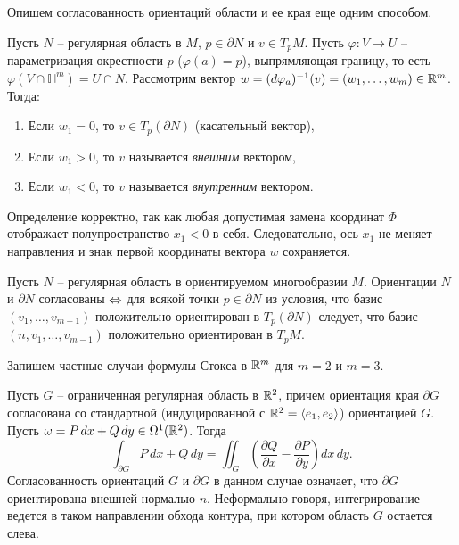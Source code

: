 Опишем согласованность ориентаций области и ее края еще одним способом.

\begin{definition}
    Пусть $N$ -- регулярная область в $M$, $p \in \partial N$ и $v \in T_p M$. 
    Пусть $\varphi: V \to U$ -- параметризация окрестности $p$ ($\varphi(a)=p$), выпрямляющая границу, то есть $\varphi(V \cap \mathbb{H}^m) = U \cap N$. 
    Рассмотрим вектор $w = (d\varphi_a)^{-1}(v) = (w_1, \dots, w_m) \in \mathbb{R}^m$. 
    Тогда:
    \begin{enumerate}[itemsep = 0pt, topsep = 5pt]
        \item Если $w_1 = 0$, то $v \in T_p(\partial N)$ (касательный вектор),
        \item Если $w_1 > 0$, то $v$ называется \textit{внешним} вектором,
        \item Если $w_1 < 0$, то $v$ называется \textit{внутренним} вектором.
    \end{enumerate}
\end{definition}

\begin{note}
    Определение корректно, так как любая допустимая замена координат $\Phi$ отображает полупространство $x_1 < 0$ в себя. Следовательно, ось $x_1$ не меняет направления и знак первой координаты вектора $w$ сохраняется.
\end{note}

\begin{proposition}
    Пусть $N$ -- регулярная область в ориентируемом многообразии $M$. Ориентации $N$ и $\partial N$ согласованы $\Leftrightarrow$ для всякой точки $p \in \partial N$ из условия, что базис $(v_1, \dots, v_{m-1})$ положительно ориентирован в $T_p(\partial N)$ следует, что базис $(n, v_1, \dots, v_{m-1})$ положительно ориентирован в $T_p M$.
\end{proposition}

Запишем частные случаи формулы Стокса в $\mathbb{R}^m$ для $m=2$ и $m=3$.

\begin{example}
Пусть $G$ -- ограниченная регулярная область в $\mathbb{R}^2$, причем ориентация края $\partial G$ согласована со стандартной (индуцированной с $\mathbb{R}^2 = \langle e_1, e_2 \rangle$) ориентацией $G$. Пусть $\omega = P\, dx + Q\, dy \in \Omega^1(\mathbb{R}^2)$. Тогда
\[
\int_{\partial G} P\, dx + Q\, dy = \iint_G \left( \frac{\partial Q}{\partial x} - \frac{\partial P}{\partial y} \right) dx \, dy.
\]
Согласованность ориентаций $G$ и $\partial G$ в данном случае означает, что $\partial G$ ориентирована внешней нормалью $n$.
Неформально говоря, интегрирование ведется в таком направлении обхода контура, при котором область $G$ остается слева. 
\end{example}

